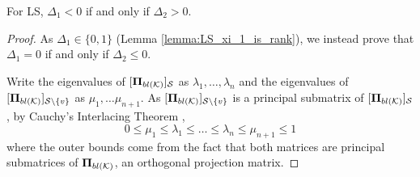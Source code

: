 \begin{lemma}    \label{lemma:LS_delta_1_improvement_means_delta_2_worse}
    For LS, $\Delta_{1} < 0 $ if and only if $ \Delta_{2} > 0$.
\end{lemma}
\begin{proof}
As $\Delta_{1} \in \{0,1\}$ (Lemma \ref{lemma:LS_xi_1_is_rank}), we instead prove that $\Delta_{1} = 0$ if and only if $ \Delta_{2} \leq 0$.

     Write the eigenvalues of $[\bm{\Pi}_{bl(\mathcal{K})}]_{\mathcal{S}}$ as $\lambda_{1}, \dots, \lambda_{n}$ and the eigenvalues of $[\bm{\Pi}_{bl(\mathcal{K})}]_{\mathcal{S} \backslash \{v\}}$ as $\mu_{1}, \dots \mu_{n+1}$. As $[\bm{\Pi}_{bl(\mathcal{K})}]_{\mathcal{S} \backslash \{v\}}$ is a principal submatrix of $[\bm{\Pi}_{bl(\mathcal{K})}]_{\mathcal{S}}$, by Cauchy's Interlacing Theorem \cite[p.~59]{bhatia2013matrix},
     \begin{equation}
         0 \leq \mu_{1} \leq \lambda_{1} \leq \dots \leq \lambda_{n} \leq \mu_{n+1} \leq 1 \label{eq:MUUM_nonnegative}
     \end{equation} 
    where the outer bounds come from the fact that both matrices are principal submatrices of $\bm{\Pi}_{bl(\mathcal{K})}$, an orthogonal projection matrix.
    

\end{proof}
